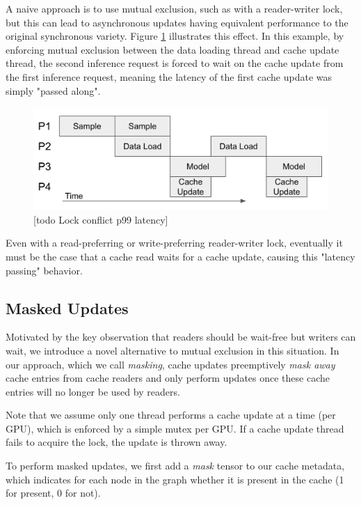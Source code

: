 A naive approach is to use mutual exclusion, such as with a reader-writer lock, but this can lead to asynchronous updates having equivalent performance to the original synchronous variety. Figure \ref{Impl: Contended pipeline} illustrates this effect. In this example, by enforcing mutual exclusion between the data loading thread and cache update thread, the second inference request is forced to wait on the cache update from the first inference request, meaning the latency of the first cache update was simply "passed along".

\begin{figure}[h!]
    \centering
    \includegraphics[width=\textwidth]{figures/Pipeline with lock.png}
    \caption{[todo Lock conflict p99 latency]}
    \label{Impl: Contended pipeline}
\end{figure}    

Even with a read-preferring or write-preferring reader-writer lock, eventually it must be the case that a cache read waits for a cache update, causing this "latency passing" behavior.  

\subsection{Masked Updates}
Motivated by the key observation that readers should be wait-free but writers can wait, we introduce a novel alternative to mutual exclusion in this situation. In our approach, which we call \textit{masking}, cache updates preemptively \textit{mask away} cache entries from cache readers and only perform updates once these cache entries will no longer be used by readers. 

Note that we assume only one thread performs a cache update at a time (per GPU), which is enforced by a simple mutex per GPU. If a cache update thread fails to acquire the lock, the update is thrown away.

To perform masked updates, we first add a \textit{mask} tensor to our cache metadata, which indicates for each node in the graph whether it is present in the cache (1 for present, 0 for not).

